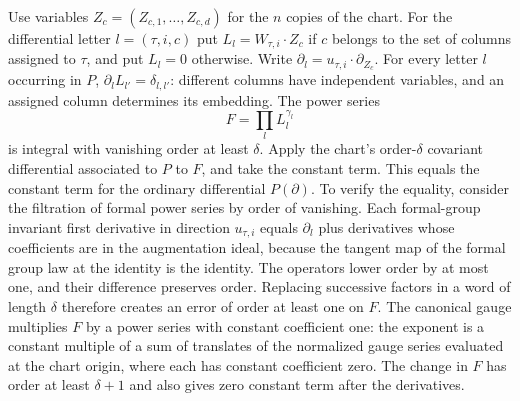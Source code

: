 Use variables \(Z_c=(Z_{c,1},\ldots,Z_{c,d})\) for the \(n\) copies
of the chart. For the differential letter \(l=(\tau,i,c)\) put
\(L_l=W_{\tau,i}\cdot Z_c\) if \(c\) belongs to the set of columns
assigned to \(\tau\), and put \(L_l=0\) otherwise.
Write \(\partial_l=u_{\tau,i}\cdot\partial_{Z_c}\).
For every letter \(l\) occurring in \(P\),
\(\partial_l L_{l'}=\delta_{l,l'}\): different columns have
independent variables, and an assigned column determines its
embedding. The power series
\[
           F=\prod_l L_l^{\gamma_l}
\]
is integral with vanishing order at least \(\delta\).
Apply the chart's order-\(\delta\) covariant differential
associated to \(P\) to \(F\), and take the constant term.
This equals the constant term for the ordinary differential
\(P(\partial)\). To verify the equality, consider the filtration of
formal power series by order of vanishing. Each formal-group
invariant first derivative in direction \(u_{\tau,i}\) equals
\(\partial_l\) plus derivatives whose coefficients are in the
augmentation ideal, because the tangent map of the formal group law
at the identity is the identity. The operators lower order by at most
one, and their difference preserves order. Replacing successive
factors in a word of length \(\delta\) therefore creates an error of
order at least one on \(F\). The canonical gauge multiplies \(F\) by
a power series with constant coefficient one: the exponent is a
constant multiple of a sum of translates of the normalized gauge
series evaluated at the chart origin, where each has constant
coefficient zero. The change in \(F\) has order at least
\(\delta+1\) and also gives zero constant term after the derivatives.


